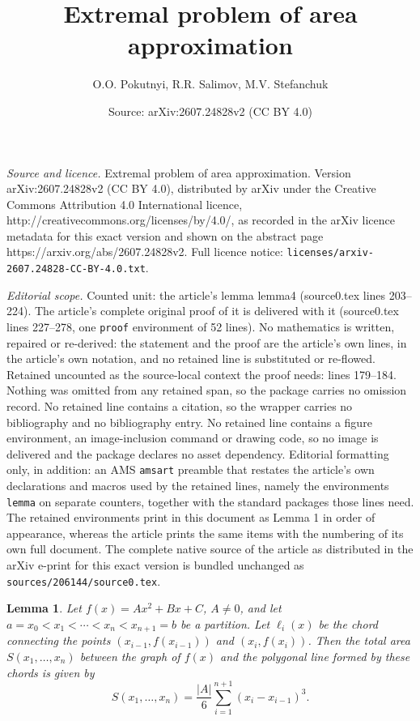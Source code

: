 \documentclass[10pt,a4paper]{amsart}
\title{Extremal problem of area approximation}
\author{O.O. Pokutnyi, R.R. Salimov, M.V. Stefanchuk}
\date{Source: arXiv:2607.24828v2 (CC BY 4.0)}
\newtheorem{lemma}{Lemma}
\begin{document}
\maketitle

\noindent\emph{Source and licence.} Extremal problem of area approximation. Version arXiv:2607.24828v2 (CC BY 4.0), distributed by arXiv under the Creative Commons Attribution 4.0 International licence, http://creativecommons.org/licenses/by/4.0/, as recorded in the arXiv licence metadata for this exact version and shown on the abstract page https://arxiv.org/abs/2607.24828v2. Full licence notice: \texttt{licenses/arxiv-2607.24828-CC-BY-4.0.txt}.\par\smallskip

\noindent\textit{Editorial scope.} Counted unit: the article's lemma lemma4 (source0.tex lines 203--224). The article's complete original proof of it is delivered with it (source0.tex lines 227--278, one \texttt{proof} environment of 52 lines). No mathematics is written, repaired or re-derived: the statement and the proof are the article's own lines, in the article's own notation, and no retained line is substituted or re-flowed.  Retained uncounted as the source-local context the proof needs: lines 179--184.  Nothing was omitted from any retained span, so the package carries no omission record.  No retained line contains a citation, so the wrapper carries no bibliography and no bibliography entry.  No retained line contains a figure environment, an image-inclusion command or drawing code, so no image is delivered and the package declares no asset dependency.  Editorial formatting only, in addition: an AMS \texttt{amsart} preamble that restates the article's own declarations and macros used by the retained lines, namely the environments \texttt{lemma} on separate counters, together with the standard packages those lines need.  The retained environments print in this document as Lemma 1 in order of appearance, whereas the article prints the same items with the numbering of its own full document.  The complete native source of the article as distributed in the arXiv e-print for this exact version is bundled unchanged as \texttt{sources/206144/source0.tex}.
\begin{lemma}\label{lemma3}
Let $f(x) = Ax^2 + Bx + C$, $A \neq 0$, and let $a =x_0 < x_1 < \cdots < x_n < x_{n+1} = b$ be a partition. Let $\ell_i(x)$ be the chord connecting the points $(x_{i-1}, f(x_{i-1}))$ and $(x_i, f(x_i))$. Then the total area $S(x_1, \ldots, x_n)$ between the graph of $f(x)$ and the polygonal line formed by these chords is given by
\[
S(x_1, \ldots, x_n) = \frac{|A|}{6} \sum_{i=1}^{n+1} (x_i - x_{i-1})^3.
\]
\end{lemma}
\end{document}
